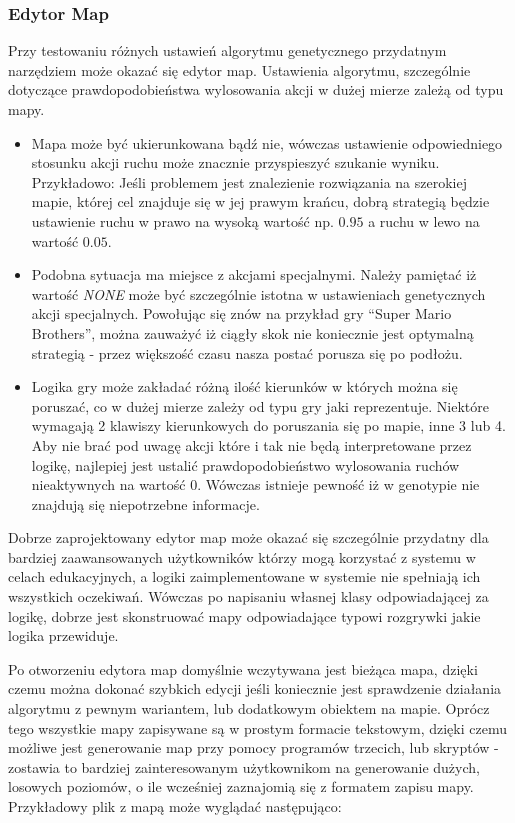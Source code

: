 \subsubsection{Edytor Map}
\begin{par}
Przy testowaniu różnych ustawień algorytmu genetycznego przydatnym narzędziem może okazać się edytor map. 
Ustawienia algorytmu, szczególnie dotyczące prawdopodobieństwa wylosowania akcji w dużej mierze zależą od typu mapy. 
\begin{itemize}
\item 
Mapa może być ukierunkowana bądź nie, wówczas ustawienie odpowiedniego stosunku akcji ruchu może znacznie przyspieszyć szukanie wyniku. Przykładowo: Jeśli problemem jest znalezienie rozwiązania na szerokiej mapie, której cel znajduje się w jej prawym krańcu, dobrą strategią będzie ustawienie ruchu w prawo na wysoką wartość np. $0.95$ a ruchu w lewo na wartość $0.05$.
\item
Podobna sytuacja ma miejsce z akcjami specjalnymi. 
Należy pamiętać iż wartość \textit{NONE} może być szczególnie istotna w ustawieniach genetycznych akcji specjalnych.
Powołując się znów na przykład gry ``Super Mario Brothers'', można zauważyć iż ciągły skok nie koniecznie jest optymalną strategią - przez większość czasu nasza postać porusza się po podłożu.
\item 
Logika gry może zakładać różną ilość kierunków w których można się poruszać, co w dużej mierze zależy od typu gry jaki reprezentuje.
Niektóre wymagają 2 klawiszy kierunkowych do poruszania się po mapie, inne 3 lub 4. 
Aby nie brać pod uwagę akcji które i tak nie będą interpretowane przez logikę, najlepiej jest ustalić prawdopodobieństwo wylosowania ruchów nieaktywnych na wartość $0$. 
Wówczas istnieje pewność iż w genotypie nie znajdują się niepotrzebne informacje.
\end{itemize}

Dobrze zaprojektowany edytor map może okazać się szczególnie przydatny dla bardziej zaawansowanych użytkowników którzy mogą korzystać z systemu w celach edukacyjnych, a logiki zaimplementowane w systemie nie spełniają ich wszystkich oczekiwań.
Wówczas po napisaniu własnej klasy odpowiadającej za logikę, dobrze jest skonstruować mapy odpowiadające typowi rozgrywki jakie logika przewiduje.

\begin{par}
	Po otworzeniu edytora map domyślnie wczytywana jest bieżąca mapa, dzięki czemu można dokonać szybkich edycji jeśli koniecznie jest sprawdzenie działania algorytmu z pewnym wariantem, lub dodatkowym obiektem na mapie.
	Oprócz tego wszystkie mapy zapisywane są w prostym formacie tekstowym, dzięki czemu możliwe jest generowanie map przy pomocy programów trzecich, lub skryptów - zostawia to bardziej zainteresowanym użytkownikom na generowanie dużych, losowych poziomów, o ile wcześniej zaznajomią się z formatem zapisu mapy.
	Przykładowy plik z mapą może wyglądać następująco:
	

\end{par}
\end{par}
